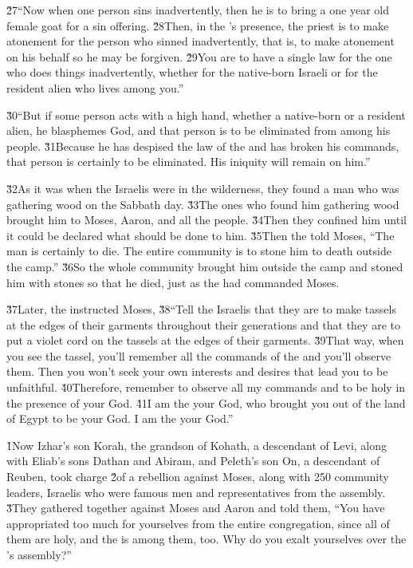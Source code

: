 \v{27}``Now when one person sins inadvertently, then he is to bring a one year old female goat for a sin offering. \v{28}Then, in the 's presence, the priest is to make atonement for the person who sinned inadvertently, that is, to make atonement on his behalf so he may be forgiven. \v{29}You are to have a single law for the one who does things inadvertently, whether for the native-born Israeli or for the resident alien who lives among you.''

\v{30}``But if some person acts with a high hand, whether a native-born or a resident alien, he blasphemes God, and that person is to be eliminated from among his people. \v{31}Because he has despised the law of the  and has broken his commands, that person is certainly to be eliminated. His iniquity will remain on him.''

\v{32}As it was when the Israelis were in the wilderness, they found a man who was gathering wood on the Sabbath day. \v{33}The ones who found him gathering wood brought him to Moses, Aaron, and all the people. \v{34}Then they confined him until it could be declared what should be done to him. \v{35}Then the  told Moses, ``The man is certainly to die. The entire community is to stone him to death outside the camp.'' \v{36}So the whole community brought him outside the camp and stoned him with stones so that he died, just as the  had commanded Moses.

\v{37}Later, the  instructed Moses, \v{38}``Tell the Israelis that they are to make tassels at the edges of their garments throughout their generations and that they are to put a violet cord on the tassels at the edges of their garments. \v{39}That way, when you see the tassel, you'll remember all the commands of the  and you'll observe them. Then you won't seek your own interests and desires that lead you to be unfaithful. \v{40}Therefore, remember to observe all my commands and to be holy in the presence of your God. \v{41}I am the  your God, who brought you out of the land of Egypt to be your God. I am the  your God.''

\v{1}Now Izhar's son Korah, the grandson of Kohath, a descendant of Levi, along with Eliab's sons Dathan and Abiram, and Peleth's son On, a descendant of Reuben, took charge \v{2}of a rebellion against Moses, along with 250 community leaders, Israelis who were famous men and representatives from the assembly. \v{3}They gathered together against Moses and Aaron and told them, ``You have appropriated too much for yourselves from the entire congregation, since all of them are holy, and the  is among them, too. Why do you exalt yourselves over the 's assembly?''

